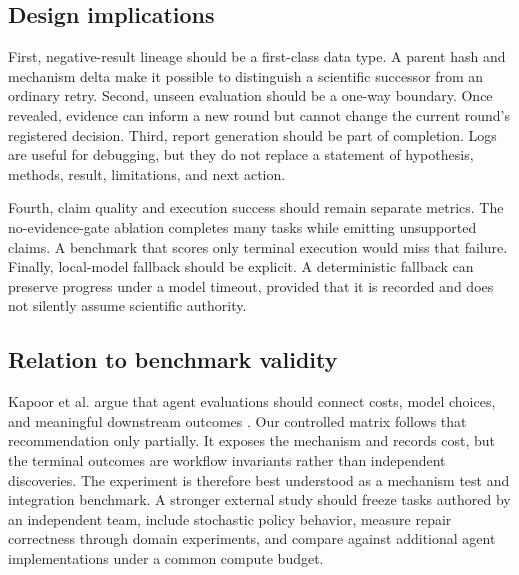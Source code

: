 \subsection{Design implications}

First, negative-result lineage should be a first-class data type. A parent
hash and mechanism delta make it possible to distinguish a scientific
successor from an ordinary retry. Second, unseen evaluation should be a
one-way boundary. Once revealed, evidence can inform a new round but cannot
change the current round's registered decision. Third, report generation
should be part of completion. Logs are useful for debugging, but they do not
replace a statement of hypothesis, methods, result, limitations, and next
action.

Fourth, claim quality and execution success should remain separate metrics.
The no-evidence-gate ablation completes many tasks while emitting unsupported
claims. A benchmark that scores only terminal execution would miss that
failure. Finally, local-model fallback should be explicit. A deterministic
fallback can preserve progress under a model timeout, provided that it is
recorded and does not silently assume scientific authority.

\subsection{Relation to benchmark validity}

Kapoor et al. argue that agent evaluations should connect costs, model
choices, and meaningful downstream outcomes \cite{kapoor2024agentsmatter}.
Our controlled matrix follows that recommendation only partially. It exposes
the mechanism and records cost, but the terminal outcomes are workflow
invariants rather than independent discoveries. The experiment is therefore
best understood as a mechanism test and integration benchmark. A stronger
external study should freeze tasks authored by an independent team, include
stochastic policy behavior, measure repair correctness through domain
experiments, and compare against additional agent implementations under a
common compute budget.
